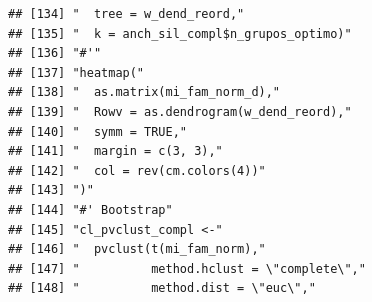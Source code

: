 \documentclass[11pt,]{article}
\begin{document}
\begin{verbatim}
## [134] "  tree = w_dend_reord,"                                                                                                                                                
## [135] "  k = anch_sil_compl$n_grupos_optimo)"                                                                                                                                 
## [136] "#'"                                                                                                                                                                    
## [137] "heatmap("                                                                                                                                                              
## [138] "  as.matrix(mi_fam_norm_d),"                                                                                                                                           
## [139] "  Rowv = as.dendrogram(w_dend_reord),"                                                                                                                                 
## [140] "  symm = TRUE,"                                                                                                                                                        
## [141] "  margin = c(3, 3),"                                                                                                                                                   
## [142] "  col = rev(cm.colors(4))"                                                                                                                                             
## [143] ")"                                                                                                                                                                     
## [144] "#' Bootstrap"                                                                                                                                                          
## [145] "cl_pvclust_compl <-"                                                                                                                                                   
## [146] "  pvclust(t(mi_fam_norm),"                                                                                                                                             
## [147] "          method.hclust = \"complete\","                                                                                                                               
## [148] "          method.dist = \"euc\","                                                                                                                                      

\end{verbatim}
\end{document}
